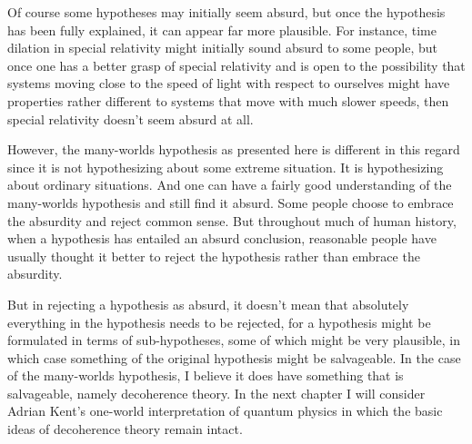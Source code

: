      Of course some hypotheses may initially seem absurd, but once the hypothesis has been fully explained, it can appear far more plausible. For instance, time dilation in special relativity might initially sound absurd to some people, but once one has a better grasp of special relativity and is open to the possibility that  systems moving close to the speed of light with respect to ourselves might have properties rather different to systems that move with much slower speeds, then special relativity doesn't seem absurd at all.  
     
     However, the many-worlds hypothesis as presented here is different in this regard since it is not hypothesizing about some extreme situation. It is hypothesizing about ordinary situations. And one can have a fairly good understanding of the many-worlds hypothesis and still find it absurd. Some people choose to embrace the absurdity and reject common sense. But throughout much of human history, when a hypothesis has entailed an absurd conclusion, reasonable people have usually thought it better to reject the hypothesis rather than embrace the absurdity. 
      
     But in rejecting a hypothesis as absurd, it doesn't mean that absolutely everything in the hypothesis needs to be rejected, for  a hypothesis might be formulated in terms of sub-hypotheses, some of which might be very plausible, in which case something of the original hypothesis might be salvageable. In the case of the many-worlds hypothesis, I believe it does have something that is salvageable, namely decoherence theory. In the next chapter I will consider Adrian Kent's one-world interpretation of quantum physics in which the basic ideas of decoherence theory remain intact.
    
    